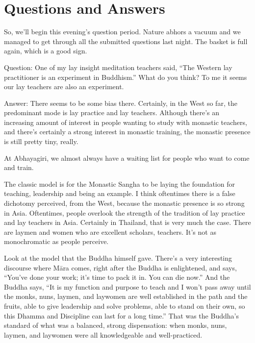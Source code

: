 \chapter{Questions and Answers}

So, we’ll begin this evening’s question period. Nature abhors a vacuum
and we managed to get through all the submitted questions last night.
The basket is full again, which is a good sign.

\vspace{\the\qaskip}
Question: One of my lay insight meditation teachers said, “The Western
lay practitioner is an experiment in Buddhism.” What do you think? To me
it seems our lay teachers are also an experiment.

\vspace{\the\qaskip}
Answer: There seems to be some bias there. Certainly, in the West so
far, the predominant mode is lay practice and lay teachers. Although
there’s an increasing amount of interest in people wanting to study with
monastic teachers, and there’s certainly a strong interest in monastic
training, the monastic presence is still pretty tiny, really.

At Abhayagiri, we almost always have a waiting list for people who want
to come and train.

The classic model is for the Monastic Sangha to be laying the foundation
for teaching, leadership and being an example. I think oftentimes there
is a false dichotomy perceived, from the West, because the monastic
presence is so strong in Asia. Oftentimes, people overlook the strength
of the tradition of lay practice and lay teachers in Asia. Certainly in
Thailand, that is very much the case. There are laymen and women who are
excellent scholars, teachers. It’s not as monochromatic as people
perceive.

Look at the model that the Buddha himself gave. There’s a very
interesting discourse where Māra comes, right after the Buddha is
enlightened, and says, “You’ve done your work; it's time to pack it in.
You can die now.” And the Buddha says, “It is my function and purpose to
teach and I won’t pass away until the monks, nuns, laymen, and laywomen
are well established in the path and the fruits, able to give leadership
and solve problems, able to stand on their own, so this Dhamma and
Discipline can last for a long time.” That was the Buddha’s standard of
what was a balanced, strong dispensation: when monks, nuns, laymen, and
laywomen were all knowledgeable and well-practiced.

